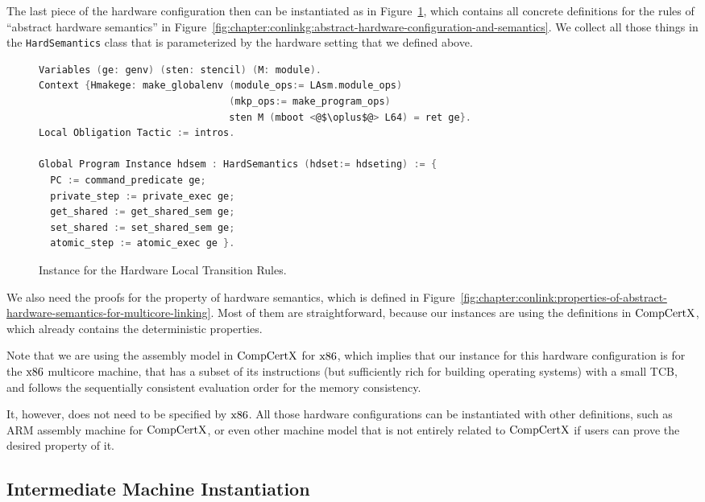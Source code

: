 The last piece of the hardware configuration then can be instantiated as in Figure~\ref{fig:chapter:certikos:hardware-local-step-transition-rules},
which contains all concrete definitions for the rules of ``abstract hardware semantics'' in  Figure~\ref{fig:chapter:conlinkg:abstract-hardware-configuration-and-semantics}.
We collect all those things in the \lstinline$HardSemantics$ class that is parameterized by the hardware setting that we defined above. 
\begin{figure}
\begin{lstlisting}[language=C]
Variables (ge: genv) (sten: stencil) (M: module).
Context {Hmakege: make_globalenv (module_ops:= LAsm.module_ops) 
                                 (mkp_ops:= make_program_ops) 
                                 sten M (mboot <@$\oplus$@> L64) = ret ge}.
Local Obligation Tactic := intros.

Global Program Instance hdsem : HardSemantics (hdset:= hdseting) := {
  PC := command_predicate ge;
  private_step := private_exec ge;
  get_shared := get_shared_sem ge;
  set_shared := set_shared_sem ge;
  atomic_step := atomic_exec ge }.
\end{lstlisting}
\caption{Instance for the Hardware Local Transition Rules.}
\label{fig:chapter:certikos:hardware-local-step-transition-rules}
\end{figure}
We also need the proofs for the property of hardware semantics, which is defined in Figure~\ref{fig:chapter:conlink:properties-of-abstract-hardware-semantics-for-multicore-linking}. 
Most of them are straightforward, because our instances are using the definitions in $\mathrm{CompCertX}$,
which already contains the deterministic properties. 

Note that we are using the assembly model in $\mathrm{CompCertX}$ for $\mathrm{x86}$, which implies that 
our instance for this hardware configuration is 
for the $\mathrm{x86}$ multicore machine,
that has a subset of its instructions (but sufficiently rich for building operating systems) with a small TCB, 
and follows the sequentially consistent evaluation order for the memory consistency. 

It, however, does not need to be specified by $\mathrm{x86}$. 
All  those hardware configurations can be instantiated with other definitions, such as ARM assembly machine for $\mathrm{CompCertX}$, 
or even other machine model that is not entirely related to $\mathrm{CompCertX}$ if users can prove the desired property of it. 

\subsection{Intermediate Machine Instantiation}
\label{chapter:certikos:subsec:intermediate-machine-instantiation}


